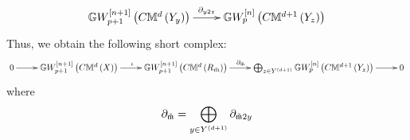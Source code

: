 \documentclass[12pt]{article}
\begin{document}
\begin{setup}
{$$\diagram  {\BG}W_{p+1}^{\LRt{n+1}}\LRf{C{\BM}^{d}\LRf{Y_y}}\ar[r]^{\partial_{y2z}} & 
{\BG}W_{p}^{\LRt{n}}\LRf{C{\BM}^{d+1}\LRf{Y_z}} \\ \enddiagram
$$
Thus, we obtain the following short complex:
\begin{equation}\label{22Maymtilde2y}
\diagram 
0 \ar[r] &{\BG}W^{\LRt{n+1}}_{p+1}\LRf{C{\BM}^{d}\LRf{X}}
\ar[r]^{\iota} & {\BG}W_{p+1}^{\LRt{n+1}}\LRf{C{\BM}^{d}\LRf{R_{\tilde{m}}}}
\ar[r]^{\partial_{\tilde{\m}}\qquad} & \bigoplus _{z\in Y^{\LRf{d+1}}}{\BG}W_{p}^{\LRt{n}}\LRf{C{\BM}^{d+1}\LRf{Y_z}}\ar[r] & 0\\
\enddiagram
\end{equation}
where 
$$
\partial_{\tilde{\mathfrak {m}}}= \bigoplus_{y\in Y^{\left( d+1\right)}}\partial_{\tilde{\mathfrak {m}}2y}
$$
}
\end{setup}

\end{document}
